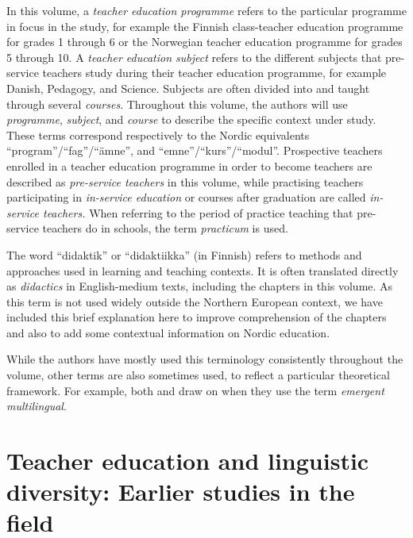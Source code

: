 \documentclass[output=paper]{langscibook}
\begin{document}
In this volume, a \textit{teacher education programme} refers to the particular programme in focus in the study, for example the Finnish class-teacher education programme for grades 1 through 6 or the Norwegian teacher education programme for grades 5 through 10. A \textit{teacher education subject} refers to the different subjects that pre-service teachers study during their teacher education programme, for example Danish, Pedagogy, and Science. Subjects are often divided into and taught through several \textit{courses}. Throughout this volume, the authors will use \textit{programme}, \textit{subject}, and \textit{course} to describe the specific context under study. These terms correspond respectively to the Nordic equivalents “program”/“fag”/“ämne”, and “emne”/“kurs”/“modul”. Prospective teachers enrolled in a teacher education programme in order to become teachers are described as \textit{pre-service teachers} in this volume, while practising teachers participating in \textit{in-service education} or courses after graduation are called \textit{in-service teachers.} When referring to the period of practice teaching that pre-service teachers do in schools, the term \textit{practicum} is used. 

The word “didaktik” or “didaktiikka” (in Finnish) refers to methods and approaches used in learning and teaching contexts. It is often translated directly as \textit{didactics} in English-medium texts, including the chapters in this volume. As this term is not used widely outside the Northern European context, we have included this brief explanation here to improve comprehension of the chapters and also to add some contextual information on Nordic education.

While the authors have mostly used this terminology consistently throughout the volume, other terms are also sometimes used, to reflect a particular theoretical framework. For example, both \textcite{chapters/6_iversen} and \textcite{chapters/8_heikkola} draw on \citet{García2009} when they use the term \textit{emergent multilingual}.

\section{{Teacher education and linguistic diversity: Earlier studies in the field}}\label{sec:reath:4}
\end{document}
